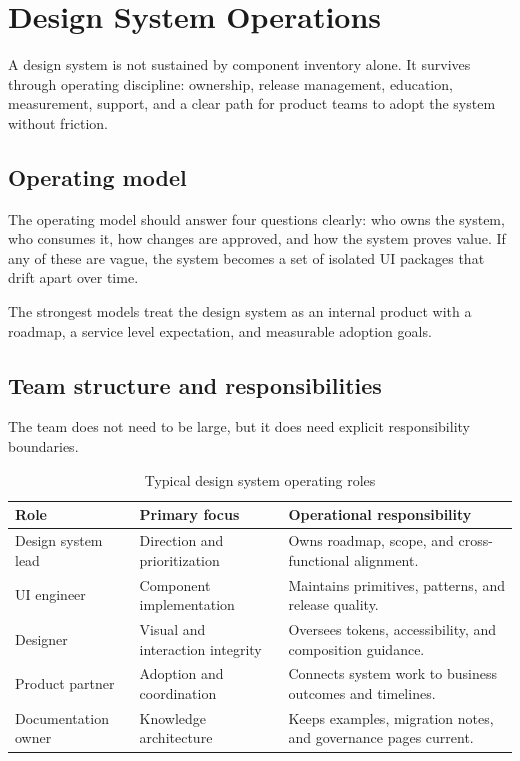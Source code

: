 \clearpage
\section{Design System Operations}

A design system is not sustained by component inventory alone. It survives through operating discipline: ownership, release management, education, measurement, support, and a clear path for product teams to adopt the system without friction.

\subsection{Operating model}
The operating model should answer four questions clearly: who owns the system, who consumes it, how changes are approved, and how the system proves value. If any of these are vague, the system becomes a set of isolated UI packages that drift apart over time.

The strongest models treat the design system as an internal product with a roadmap, a service level expectation, and measurable adoption goals.

\subsection{Team structure and responsibilities}
The team does not need to be large, but it does need explicit responsibility boundaries.

\begin{table}[htbp]
  \centering
  \caption{Typical design system operating roles}
  \begin{tabularx}{\textwidth}{@{}p{}p{}X@{}}
    \toprule
    \textbf{Role} & \textbf{Primary focus} & \textbf{Operational responsibility} \\
    \midrule
    Design system lead & Direction and prioritization & Owns roadmap, scope, and cross-functional alignment. \\
    UI engineer & Component implementation & Maintains primitives, patterns, and release quality. \\
    Designer & Visual and interaction integrity & Oversees tokens, accessibility, and composition guidance. \\
    Product partner & Adoption and coordination & Connects system work to business outcomes and timelines. \\
    Documentation owner & Knowledge architecture & Keeps examples, migration notes, and governance pages current. \\
    \bottomrule
  \end{tabularx}
\end{table}

